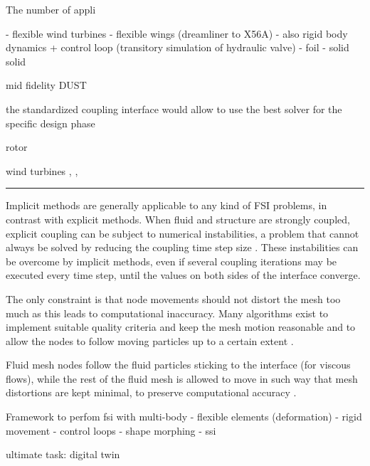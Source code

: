 The number of appli


- flexible wind turbines
- flexible wings (dreamliner to X56A)
- also rigid body dynamics + control loop (transitory simulation of hydraulic valve)
- foil
- solid solid 


mid fidelity DUST \cite{cocco2020simulation}

the standardized coupling interface would allow to use the best solver for the specific design phase 

rotor \cite{quaranta2004toward}  \cite{cavagna2009simulation}  \cite{masarati2011coupled}

wind turbines \cite{guerri2008fluid}, \cite{rasheed2014comprehensive}, \cite{roul2020fluid} 





\noindent\rule{\textwidth}{1pt}









Implicit methods are generally applicable to any kind of FSI problems, in contrast with explicit methods. When fluid and structure are strongly coupled, explicit coupling can be subject to numerical instabilities, a problem that cannot always be solved by reducing the coupling time step size \cite{van2009added}. These instabilities can be overcome by implicit methods, even if several coupling iterations may be executed every time step, until the values on both sides of the interface converge.

The only constraint is that node movements should not distort the mesh too much as this leads to computational inaccuracy. Many algorithms exist to implement suitable quality criteria and keep the mesh motion reasonable and to allow the nodes to follow moving particles up to a certain extent \cite{de2007mesh}.

Fluid mesh nodes follow the fluid particles sticking to the interface (for viscous flows), while the rest of the fluid mesh is allowed to move in such way that mesh distortions are kept minimal, to preserve computational accuracy \cite{ramm1998fluid}.






Framework to perfom fsi with multi-body
- flexible elements (deformation)
- rigid movement
- control loops
- shape morphing
- ssi


ultimate task: digital twin
